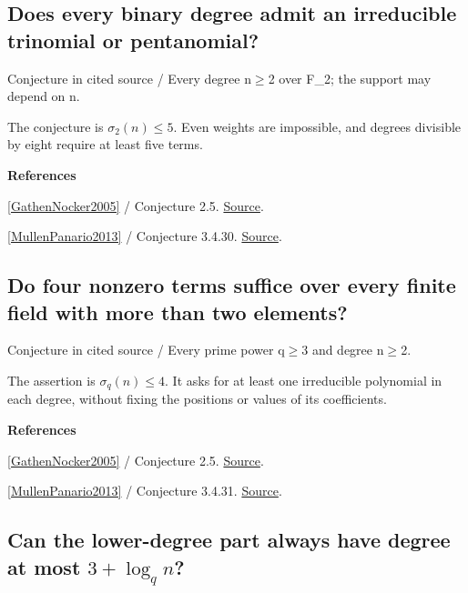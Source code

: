 \documentclass[11pt,a4paper,oneside,openany]{book}
\newenvironment{sources}{\par\smallskip\begingroup\footnotesize\color{atlasgray}\leftskip=10pt\setlength{\parskip}{2pt}}{\par\endgroup\smallskip}
\begin{document}
\subsection*{Does every binary degree admit an irreducible trinomial or pentanomial?}
{\small\sffamily\color{atlasgold}Conjecture in cited source / Every degree n\ensuremath{\ge}2 over F\_\allowbreak{}2; the support may depend on n.}\par\smallskip
\color{black} The conjecture is \(\sigma_2(n)\le5\). Even weights are impossible, and degrees divisible by eight require at least five terms.\par
\begin{sources}
\textbf{References}\par\smallskip
\noindent\hyperlink{ref:GathenNocker2005}{[GathenNocker2005]} / Conjecture 2.5.  \href{https://vonzurgathen.online/old/files/gatnoc05.pdf}{Source}.\par
\noindent\hyperlink{ref:MullenPanario2013}{[MullenPanario2013]} / Conjecture 3.4.30.  \href{https://doi.org/10.1201/b15006}{Source}.\par
\end{sources}\color{black}
\subsection*{Do four nonzero terms suffice over every finite field with more than two elements?}
{\small\sffamily\color{atlasgold}Conjecture in cited source / Every prime power q\ensuremath{\ge}3 and degree n\ensuremath{\ge}2.}\par\smallskip
\color{black} The assertion is \(\sigma_q(n)\le4\). It asks for at least one irreducible polynomial in each degree, without fixing the positions or values of its coefficients.\par
\begin{sources}
\textbf{References}\par\smallskip
\noindent\hyperlink{ref:GathenNocker2005}{[GathenNocker2005]} / Conjecture 2.5.  \href{https://vonzurgathen.online/old/files/gatnoc05.pdf}{Source}.\par
\noindent\hyperlink{ref:MullenPanario2013}{[MullenPanario2013]} / Conjecture 3.4.31.  \href{https://doi.org/10.1201/b15006}{Source}.\par
\end{sources}\color{black}
\subsection*{Can the lower-degree part always have degree at most \(3+\log_q n\)?}
\end{document}
